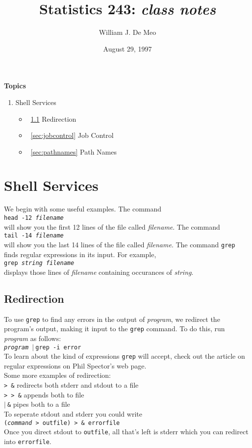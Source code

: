 \documentclass{article}
\newcommand{\pipe}{$|\:$}
\begin{document}
\title{Statistics 243: \emph{class notes}}
\author{William J. De Meo}
\date{August 29, 1997}
\maketitle

{\bf Topics}\\
\begin{enumerate}
\item Shell Services
\begin{itemize}
\item ~\ref{sec:redirection} Redirection
\item ~\ref{sec:jobcontrol} Job Control
\item ~\ref{sec:pathnames} Path Names
\end{itemize}
\end{enumerate}

\section{Shell Services}

We begin with some useful examples.  The command \\
{\tt head -12 \emph{filename}}\\
will show you the first 12 lines of the file called \emph{filename}. 
The command \\
{\tt tail -14 \emph{filename}}\\
will show you the last 14 lines of the file called  \emph{filename}.  The
command {\tt grep} finds regular expressions in its input.  For example,\\
{\tt grep \emph{string} \emph{filename} } \\
displays those lines of \emph{filename} containing occurances of \emph{string}.

\subsection{Redirection}
\label{sec:redirection}
To use {\tt grep} to find any errors in the output of \emph{program},
we redirect the program's output, making it input to the {\tt grep}
command.  To do this, run \emph{program} as follows: \\
{\tt \emph{program} \pipe grep -i error}\\
To learn about the kind of expressions {\tt grep} will accept, check 
out the article on regular expressions on Phil Spector's web page.\\
Some more examples of redirection:\\
{\tt > \&} redirects both stderr and stdout to a file \\
{\tt > > \&} appends both to file \\
{\tt \pipe \&}  pipes both to a file \\
To seperate stdout and stderr you could write \\
{\tt(\emph{command} >  outfile) > \& errorfile} \\
Once you direct stdout to {\tt outfile}, all that's left is stderr 
which you can redirect into {\tt errorfile}.
\end{document}

